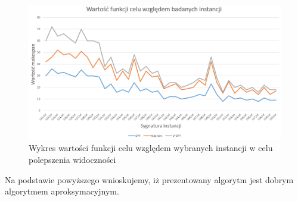 \documentclass[12pt, a4paper]{report}
\begin{document}
  \begin{figure}[H]
    \includegraphics[scale=0.5]{2}
    \centering
    \caption{Wykres wartości funkcji celu względem wybranych instancji w celu polepszenia widoczności}
  \end{figure}
  Na podstawie powyższego wnioskujemy, iż prezentowany algorytm jest dobrym algorytmem aproksymacyjnym.
\end{document}
